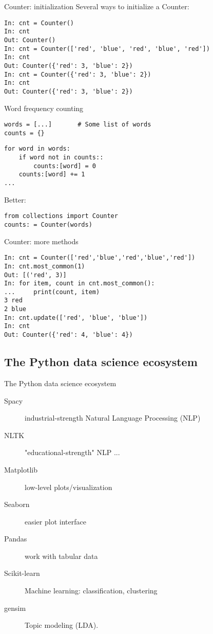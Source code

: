 \documentclass[aspectratio=169,usenames,dvipsnames]{beamer}
\begin{document}
\begin{frame}[fragile]{Counter: initialization}
Several ways to initialize a Counter:\\

\begin{lstlisting}
In: cnt = Counter()
In: cnt
Out: Counter()
In: cnt = Counter(['red', 'blue', 'red', 'blue', 'red'])
In: cnt
Out: Counter({'red': 3, 'blue': 2})
In: cnt = Counter({'red': 3, 'blue': 2})
In: cnt
Out: Counter({'red': 3, 'blue': 2})
\end{lstlisting}
\end{frame}

\begin{frame}[fragile]{Word frequency counting}
\begin{lstlisting}
words = [...]       # Some list of words
counts = {}
\end{lstlisting}\pause
\begin{lstlisting}
for word in words:
    if word not in counts::
        counts:[word] = 0
	counts:[word] += 1
...
\end{lstlisting}
\pause
Better:
\begin{lstlisting}
from collections import Counter
counts: = Counter(words)
\end{lstlisting}
\end{frame}

\begin{frame}[fragile]{Counter: more methods}
\begin{lstlisting}
In: cnt = Counter(['red','blue','red','blue','red'])
In: cnt.most_common(1)
Out: [('red', 3)]
In: for item, count in cnt.most_common():
...     print(count, item)
3 red
2 blue
In: cnt.update(['red', 'blue', 'blue'])
In: cnt
Out: Counter({'red': 4, 'blue': 4})

\end{lstlisting}
\end{frame}


\subsection{The Python data science ecosystem}
\begin{frame}[fragile]{The Python data science ecosystem}
    \begin{description}
        \item[Spacy] industrial-strength Natural Language Processing (NLP)
        \item[NLTK] "educational-strength" NLP ...
        \item[Matplotlib] low-level plots/visualization
        \item[Seaborn] easier plot interface
        \item[Pandas] work with tabular data
        \item[Scikit-learn] Machine learning: classification, clustering
        \item[gensim] Topic modeling (LDA).
    \end{description}

	
\end{frame}
\end{document}
